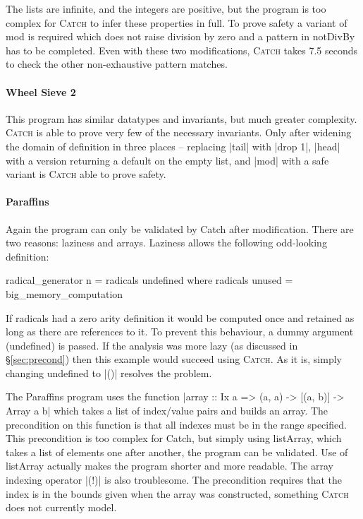 \documentclass[preprint]{sigplanconf}
\newcommand{\C}[1]{\textsf{#1}}
\newcommand{\catch}{\textsc{Catch}}
\begin{document}
The lists are infinite, and the integers are positive, but the program is too complex for \catch{} to infer these properties in full. To prove safety a variant of \C{mod} is required which does not raise division by zero and a pattern in \C{notDivBy} has to be completed. Even with these two modifications, \catch{} takes 7.5 seconds to check the other non-exhaustive pattern matches.


\paragraph{Wheel Sieve 2}

This program has similar datatypes and invariants, but much greater complexity. \catch{} is able to prove very few of the necessary invariants. Only after widening the domain of definition in three places -- replacing |tail| with |drop 1|, |head| with a version returning a default on the empty list, and |mod| with a safe variant is \catch{} able to prove safety.


\paragraph{Paraffins}

Again the program can only be validated by Catch after modification. There are two reasons: laziness and arrays. Laziness allows the following odd-looking definition:

\begin{code}
radical_generator n = radicals undefined
  where radicals unused = big_memory_computation
\end{code}

If \C{radicals} had a zero arity definition it would be computed once and retained as long as there are references to it. To prevent this behaviour, a dummy argument (\C{undefined}) is passed. If the analysis was more lazy (as discussed in \S\ref{sec:precond}) then this example would succeed using \catch{}. As it is, simply changing \C{undefined} to |()| resolves the problem.

The Paraffins program uses the function |array :: Ix a => (a, a) -> [(a, b)] -> Array a b| which takes a list of index/value pairs and builds an array. The precondition on this function is that all indexes must be in the range specified. This precondition is too complex for Catch, but simply using \C{listArray}, which takes a list of elements one after another, the program can be validated. Use of \C{listArray} actually makes the program shorter and more readable. The array indexing operator |(!)| is also troublesome. The precondition requires that the index is in the bounds given when the array was constructed, something \catch{} does not currently model.
\end{document}
